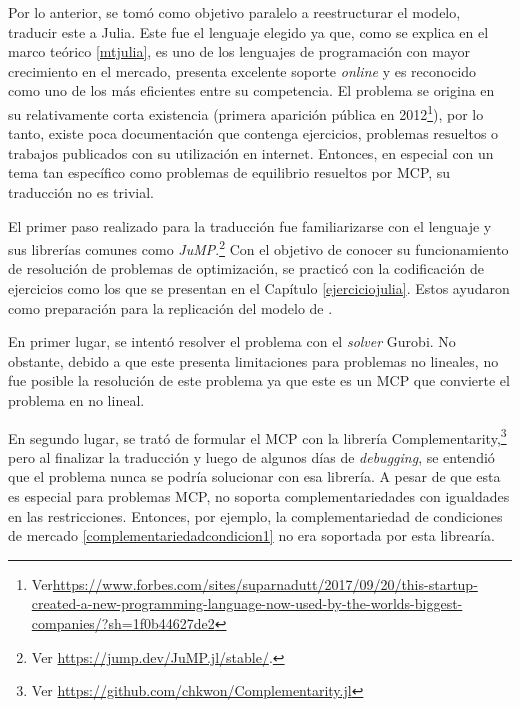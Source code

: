 Por lo anterior, se tomó como objetivo paralelo a reestructurar el modelo, traducir este a Julia. Este fue el lenguaje elegido ya que, como se explica en el marco teórico \ref{mtjulia}, es uno de los lenguajes de programación con mayor crecimiento en el mercado, presenta excelente soporte \textit{online} y es reconocido como uno de los más eficientes entre su competencia. El problema se origina en su relativamente corta existencia (primera aparición pública en 2012\footnote{Ver{\tiny  \url{https://www.forbes.com/sites/suparnadutt/2017/09/20/this-startup-created-a-new-programming-language-now-used-by-the-worlds-biggest-companies/?sh=1f0b44627de2}}}), por lo tanto, existe poca documentación que contenga ejercicios, problemas resueltos o trabajos publicados con su utilización en internet. Entonces, en especial con un tema tan específico como problemas de equilibrio resueltos por MCP, su traducción no es trivial.
\vspace{2.5mm}

El primer paso realizado para la traducción fue familiarizarse con el lenguaje y sus librerías comunes como \textit{JuMP}.\footnote{ Ver \url{https://jump.dev/JuMP.jl/stable/}.} Con el objetivo de conocer su funcionamiento de resolución de problemas de optimización, se practicó con la codificación de ejercicios como los que se presentan en el Capítulo \ref{ejerciciojulia}. Estos ayudaron como preparación para la replicación del modelo de .
\vspace{2.5mm}

En primer lugar, se intentó resolver el problema con el \textit{solver} Gurobi. No obstante, debido a que este presenta limitaciones para problemas no lineales, no fue posible la resolución de este problema ya que este es un MCP que convierte el problema en no lineal.
\vspace{2.5mm}

En segundo lugar, se trató de formular el MCP con la librería Complementarity,\footnote{Ver \url{https://github.com/chkwon/Complementarity.jl}} pero al finalizar la traducción y luego de algunos días de \textit{debugging}, se entendió que el problema nunca se podría solucionar con esa librería. A pesar de que esta es especial para problemas MCP, no soporta complementariedades con igualdades en las restricciones. Entonces, por ejemplo, la complementariedad de condiciones de mercado \ref{complementariedadcondicion1} no era soportada por esta librearía. 
\vspace{2.5mm}

